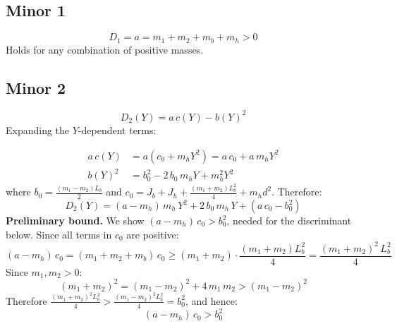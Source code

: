 \documentclass[11pt]{article}
\begin{document}
\subsection{Minor 1}

\begin{equation}
    D_1 = a = m_1 + m_2 + m_b + m_h > 0
\end{equation}
Holds for any combination of positive masses.

\subsection{Minor 2}

\begin{equation}
    D_2(Y) = a\,c(Y) - b(Y)^2
\end{equation}
Expanding the $Y$-dependent terms:

\begin{align}
    a\,c(Y)  &= a\!\left(c_0 + m_h Y^2\right) = a\,c_0 + a\,m_h Y^2 \\
    b(Y)^2   &= b_0^2 - 2\,b_0\,m_h Y + m_h^2 Y^2
\end{align}
where $b_0 = \tfrac{(m_1-m_2)L_b}{2}$ and $c_0 = J_b + J_h + \tfrac{(m_1+m_2)L_b^2}{4} + m_h d^2$.
Therefore:
\begin{equation}
    D_2(Y) = (a - m_h)\,m_h\, Y^2 + 2\,b_0\,m_h\, Y + (a\,c_0 - b_0^2)
\end{equation}
\noindent\textbf{Preliminary bound.}\quad
We show $(a-m_h)\,c_0 > b_0^2$, needed for the discriminant below.
Since all terms in $c_0$ are positive:
\begin{equation}
    (a-m_h)\,c_0 = (m_1+m_2+m_b)\,c_0 \geq (m_1+m_2)\cdot\frac{(m_1+m_2)L_b^2}{4} = \frac{(m_1+m_2)^2\,L_b^2}{4}
\end{equation}
Since $m_1, m_2 > 0$:
\begin{equation}
    (m_1+m_2)^2 = (m_1-m_2)^2 + 4\,m_1\,m_2 > (m_1-m_2)^2
\end{equation}
Therefore $\tfrac{(m_1+m_2)^2 L_b^2}{4} > \tfrac{(m_1-m_2)^2 L_b^2}{4} = b_0^2$, and hence:
\begin{equation}
    (a-m_h)\,c_0 > b_0^2 \label{eq:tighter}
\end{equation}
\end{document}
